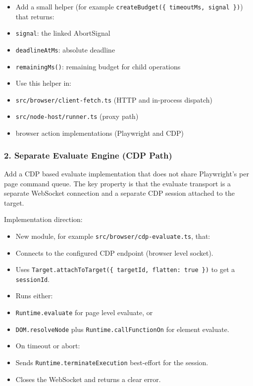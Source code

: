 \begin{itemize}
  \item Add a small helper (for example \texttt{createBudget(\{ timeoutMs, signal \})}) that returns:
  \item \texttt{signal}: the linked AbortSignal
  \item \texttt{deadlineAtMs}: absolute deadline
  \item \texttt{remainingMs()}: remaining budget for child operations
  \item Use this helper in:
  \item \texttt{src/browser/client-fetch.ts} (HTTP and in-process dispatch)
  \item \texttt{src/node-host/runner.ts} (proxy path)
  \item browser action implementations (Playwright and CDP)
\end{itemize}


\subsubsection{2. Separate Evaluate Engine (CDP Path)}


Add a CDP based evaluate implementation that does not share Playwright's per page command
queue. The key property is that the evaluate transport is a separate WebSocket connection
and a separate CDP session attached to the target.

Implementation direction:

\begin{itemize}
  \item New module, for example \texttt{src/browser/cdp-evaluate.ts}, that:
  \item Connects to the configured CDP endpoint (browser level socket).
  \item Uses \texttt{Target.attachToTarget(\{ targetId, flatten: true \})} to get a \texttt{sessionId}.
  \item Runs either:
  \item \texttt{Runtime.evaluate} for page level evaluate, or
  \item \texttt{DOM.resolveNode} plus \texttt{Runtime.callFunctionOn} for element evaluate.
  \item On timeout or abort:
  \item Sends \texttt{Runtime.terminateExecution} best-effort for the session.
  \item Closes the WebSocket and returns a clear error.
\end{itemize}


